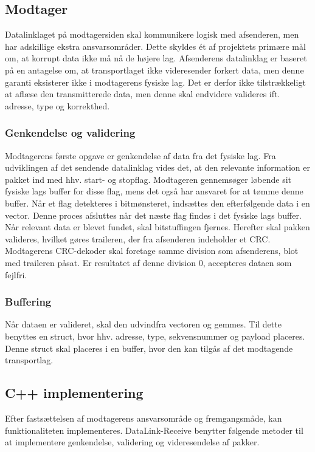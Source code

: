 \subsection{Modtager}
Datalinklaget på modtagersiden skal kommunikere logisk med afsenderen, men har adskillige ekstra ansvarsområder. Dette skyldes ét af projektets primære mål om, at korrupt data ikke må nå de højere lag. Afsenderens datalinklag er baseret på en antagelse om, at transportlaget ikke videresender forkert data, men denne garanti eksisterer ikke i modtagerens fysiske lag. Det er derfor ikke tilstrækkeligt at aflæse den transmitterede data, men denne skal endvidere valideres ift. adresse, type og korrekthed.

\subsubsection{Genkendelse og validering}
Modtagerens første opgave er genkendelse af data fra det fysiske lag. Fra udviklingen af det sendende datalinklag vides det, at den relevante information er pakket ind med hhv. start- og stopflag. Modtageren gennemsøger løbende sit fysiske lags buffer for disse flag, mens det også har ansvaret for at tømme denne buffer. Når et flag detekteres i bitmønsteret, indsættes den efterfølgende data i en vector. Denne proces afsluttes når det næste flag findes i det fysiske lags buffer.
    Når relevant data er blevet fundet, skal bitstuffingen fjernes. Herefter skal pakken valideres, hvilket gøres traileren, der fra afsenderen indeholder et CRC. Modtagerens CRC-dekoder skal foretage samme division som afsenderens, blot med traileren påsat. Er resultatet af denne division 0, accepteres dataen som fejlfri.
    
\subsubsection{Buffering}
Når dataen er valideret, skal den udvindfra vectoren og gemmes. Til dette benyttes en struct, hvor hhv. adresse, type, sekvensnummer og payload placeres. Denne struct skal placeres i en buffer, hvor den kan tilgås af det modtagende transportlag.

\subsection{C++ implementering}
Efter fastsættelsen af modtagerens ansvarsområde og fremgangsmåde, kan funktionaliteten implementeres.
	DataLink-Receive benytter følgende metoder til at implementere genkendelse, validering og videresendelse af pakker.

